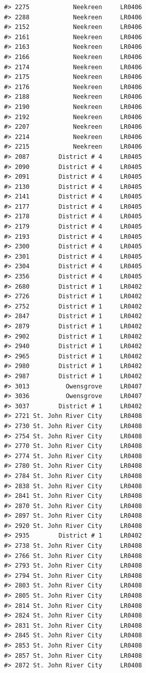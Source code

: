\documentclass[12pt,a4paper]{book}
\theoremstyle{definition}
\theoremstyle{definition}
\theoremstyle{definition}
\theoremstyle{remark}
\begin{document}
\begin{verbatim}
#> 2275            Neekreen     LR0406
#> 2288            Neekreen     LR0406
#> 2152            Neekreen     LR0406
#> 2161            Neekreen     LR0406
#> 2163            Neekreen     LR0406
#> 2166            Neekreen     LR0406
#> 2174            Neekreen     LR0406
#> 2175            Neekreen     LR0406
#> 2176            Neekreen     LR0406
#> 2188            Neekreen     LR0406
#> 2190            Neekreen     LR0406
#> 2192            Neekreen     LR0406
#> 2207            Neekreen     LR0406
#> 2214            Neekreen     LR0406
#> 2215            Neekreen     LR0406
#> 2087        District # 4     LR0405
#> 2090        District # 4     LR0405
#> 2091        District # 4     LR0405
#> 2130        District # 4     LR0405
#> 2141        District # 4     LR0405
#> 2177        District # 4     LR0405
#> 2178        District # 4     LR0405
#> 2179        District # 4     LR0405
#> 2193        District # 4     LR0405
#> 2300        District # 4     LR0405
#> 2301        District # 4     LR0405
#> 2304        District # 4     LR0405
#> 2356        District # 4     LR0405
#> 2680        District # 1     LR0402
#> 2726        District # 1     LR0402
#> 2752        District # 1     LR0402
#> 2847        District # 1     LR0402
#> 2879        District # 1     LR0402
#> 2902        District # 1     LR0402
#> 2940        District # 1     LR0402
#> 2965        District # 1     LR0402
#> 2980        District # 1     LR0402
#> 2987        District # 1     LR0402
#> 3013          Owensgrove     LR0407
#> 3036          Owensgrove     LR0407
#> 3037        District # 1     LR0402
#> 2721 St. John River City     LR0408
#> 2730 St. John River City     LR0408
#> 2754 St. John River City     LR0408
#> 2770 St. John River City     LR0408
#> 2774 St. John River City     LR0408
#> 2780 St. John River City     LR0408
#> 2784 St. John River City     LR0408
#> 2838 St. John River City     LR0408
#> 2841 St. John River City     LR0408
#> 2870 St. John River City     LR0408
#> 2897 St. John River City     LR0408
#> 2920 St. John River City     LR0408
#> 2935        District # 1     LR0402
#> 2738 St. John River City     LR0408
#> 2766 St. John River City     LR0408
#> 2793 St. John River City     LR0408
#> 2794 St. John River City     LR0408
#> 2803 St. John River City     LR0408
#> 2805 St. John River City     LR0408
#> 2814 St. John River City     LR0408
#> 2824 St. John River City     LR0408
#> 2831 St. John River City     LR0408
#> 2845 St. John River City     LR0408
#> 2853 St. John River City     LR0408
#> 2857 St. John River City     LR0408
#> 2872 St. John River City     LR0408

\end{verbatim}
\end{document}
